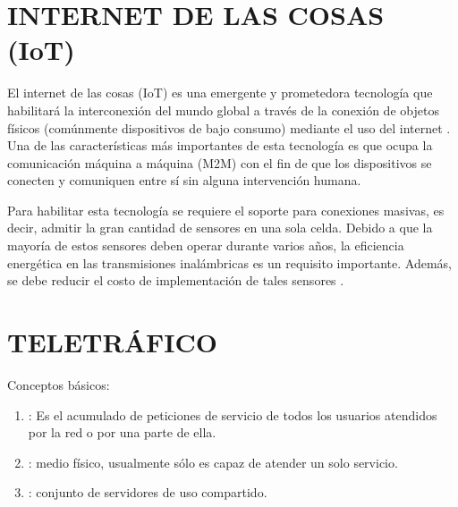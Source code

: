 \section{INTERNET DE LAS COSAS (IoT)}


El internet de las cosas (IoT) es una emergente y prometedora tecnología que habilitará la interconexión del mundo global a través de la conexión de objetos físicos (comúnmente dispositivos de bajo consumo) mediante el uso del internet \parencite{5GSurveyAkpaku}. Una de las características más importantes de esta tecnología es que ocupa la comunicación máquina a máquina (M2M) con el fin de que los dispositivos se conecten y comuniquen entre sí sin alguna intervención humana.\newline

Para habilitar esta tecnología se requiere el soporte para conexiones masivas, es decir, admitir la gran cantidad de sensores en una sola celda. Debido a que la mayoría de estos sensores deben operar durante varios años, la eficiencia energética en las transmisiones inalámbricas es un requisito importante. Además, se debe reducir el costo de implementación de tales sensores \parencite{IoT5GWire}.



\section{TELETRÁFICO}

Conceptos básicos:
\begin{enumerate}
\item  {}: Es el acumulado de peticiones de servicio de todos los usuarios atendidos por la red o por una parte de ella.
\item  {}: medio físico, usualmente sólo es capaz de atender un solo servicio.
\item  {}: conjunto de servidores de uso compartido.
\end{enumerate}

